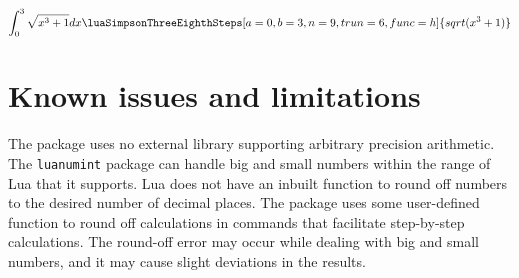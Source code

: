 \documentclass{article}
\begin{document}
\begin{table}[H]
\centering
\begin{dmath*} 
\int_{0}^{3}\sqrt{x^3+1} dx
\luaSimpsonThreeEighthSteps[a=0,b=3,n=9,trun=6,func=h]{sqrt(x^3+1)}
\end{dmath*} 
\caption{The luaSimpsonThreeEightSteps command}
\label{tbl:luasimpthree}
\end{table}

\section{Known issues and limitations} 
The package uses no external library supporting arbitrary precision arithmetic. The \verb|luanumint| package can handle big and small numbers within the range of Lua that it supports. Lua does not have an inbuilt function to round off numbers to the desired number of decimal places. The package uses some user-defined function to round off calculations in commands that facilitate step-by-step calculations. The round-off error may occur while dealing with big and small numbers, and it may cause slight deviations in the results. 
\end{document}
